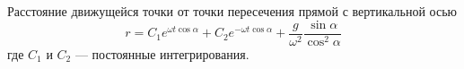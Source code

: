 Расстояние движущейся точки от точки пересечения прямой с вертикальной осью
$$r = C_1e^{\omega t\cos{\alpha}} + C_2e^{-\omega t\cos{\alpha}} + \frac{g}{\omega^2}\frac{\sin{\alpha}}{\cos^2{\alpha}}$$
где $C_1$ и $C_2$ --- постоянные интегрирования.
